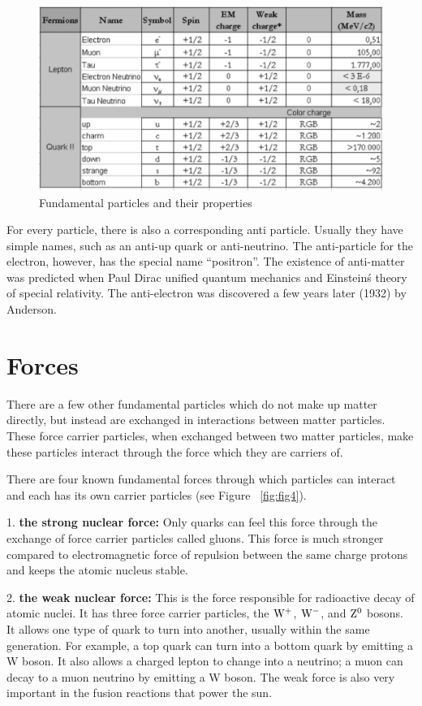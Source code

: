 \begin{figure}[h]
\centering\includegraphics[scale=0.5]{./ElementaryParticles/Pictures/fig5.pdf}
\caption{Fundamental particles and their properties}
\label{fig:fig5}
\end{figure}


For every particle, there is also a corresponding anti particle.  Usually they have simple names, such as an anti-up quark or anti-neutrino.  The anti-particle for the electron, however, has the special name “positron”.  The existence of anti-matter was predicted when Paul Dirac unified quantum mechanics and Einstein\'s theory of special relativity.  The anti-electron was discovered a few years later (1932) by Anderson.

\section{Forces} 
There are a few other fundamental particles which do not make up matter directly, but instead are exchanged in interactions between matter particles. These force carrier particles, when exchanged between two matter particles, make these particles interact through the force which they are carriers of. 

There are four known fundamental forces
through which particles can interact and each has its own carrier particles
 (see Figure ~\ref{fig:fig4}). 

1.	{\bf the strong nuclear force:} 
Only quarks can feel this force through the exchange of force carrier particles called gluons. This force is much stronger compared to electromagnetic force of repulsion between the same charge protons and keeps the atomic nucleus stable.


2.	{\bf the weak nuclear force:}
This is the force responsible for radioactive decay of atomic nuclei.  It has three force carrier particles, 
the $\rm{W^+}$, $\rm{W^-}$, and $\rm{Z^0}$ bosons. It allows one type of quark to turn into another, usually within the same generation.  
For example, a top quark can turn into a bottom quark by emitting a W boson.  It also allows a charged lepton to change into a neutrino; a muon can decay to a muon neutrino by emitting a W boson.  The weak force is also very important in the fusion reactions that power the sun.

